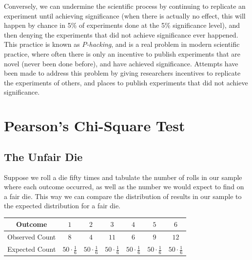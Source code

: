 Conversely, we can undermine the scientific process by continuing to replicate an experiment until achieving significance (when there is actually no effect, this will happen by chance in 5\% of experiments done at the 5\% significance level), and then denying the experiments that did not achieve significance ever happened. This practice is known as \emph{$P$-hacking}, and is a real problem in modern scientific practice, where often there is only an incentive to publish experiments that are novel (never been done before), and have achieved significance. Attempts have been made to address this problem by giving researchers incentives to replicate the experiments of others, and places to publish experiments that did not achieve significance.


\section{Pearson's Chi-Square Test}

\subsection*{The Unfair Die}


Suppose we roll a die fifty times and tabulate the number of rolls in our sample where each outcome occurred, as well as the number we would expect to find on a fair die. This way we can compare the distribution of results in our sample to the expected distribution for a fair die.

\renewcommand{\arraystretch}{1.25}
\begin{center}
\begin{tabular}{|c|c|c|c|c|c|c|}
\hline
Outcome & $1$ & $2$ & $3$ & $4$ & $5$ & $6$ \\
\hline
Observed Count & $8$ & $4$ & $11$ & $6$ & $9$ & $12$ \\
\hline
Expected Count & $50\cdot\frac{1}{6}$ & $50\cdot\frac{1}{6}$ & $50\cdot\frac{1}{6}$ & $50\cdot\frac{1}{6}$ & $50\cdot\frac{1}{6}$ & $50\cdot\frac{1}{6}$ \\
\hline
\end{tabular}
\end{center}

